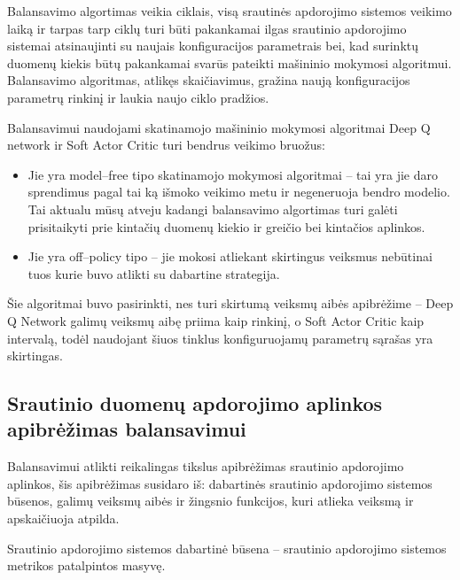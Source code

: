 \documentclass{VUMIFPSbakalaurinis}
\begin{document}
Balansavimo algortimas veikia ciklais, visą srautinės apdorojimo sistemos veikimo laiką ir tarpas tarp ciklų turi būti pakankamai ilgas srautinio apdorojimo sistemai atsinaujinti su naujais konfiguracijos parametrais bei, kad surinktų duomenų kiekis būtų pakankamai svarūs pateikti mašininio mokymosi algoritmui. Balansavimo algoritmas, atlikęs skaičiavimus, gražina naują konfiguracijos parametrų rinkinį ir laukia naujo ciklo pradžios. 



Balansavimui naudojami skatinamojo mašininio mokymosi algoritmai Deep Q network ir Soft Actor Critic turi bendrus veikimo bruožus:
\begin{itemize}
    \item Jie yra model–free tipo skatinamojo mokymosi algoritmai – tai yra jie daro sprendimus pagal tai ką išmoko veikimo metu ir negeneruoja bendro modelio. Tai aktualu mūsų atveju kadangi balansavimo algortimas turi galėti prisitaikyti prie kintačių duomenų kiekio ir greičio bei kintačios aplinkos.
    \item Jie yra off–policy tipo – jie mokosi atliekant skirtingus veiksmus nebūtinai tuos kurie buvo atlikti su dabartine strategija.
\end{itemize} 

Šie algoritmai buvo pasirinkti, nes turi skirtumą veiksmų aibės apibrėžime – Deep Q Network galimų veiksmų aibę priima kaip rinkinį, o Soft Actor Critic kaip intervalą, todėl naudojant šiuos tinklus konfiguruojamų parametrų sąrašas yra skirtingas. 

\subsection{Srautinio duomenų apdorojimo aplinkos apibrėžimas balansavimui}

Balansavimui atlikti reikalingas tikslus apibrėžimas srautinio apdorojimo aplinkos, šis apibrėžimas susidaro iš: dabartinės srautinio apdorojimo sistemos būsenos, galimų veiksmų aibės ir žingsnio funkcijos, kuri atlieka veiksmą ir apskaičiuoja atpilda.

Srautinio apdorojimo sistemos dabartinė būsena – srautinio apdorojimo sistemos metrikos patalpintos masyvę.
\end{document}
